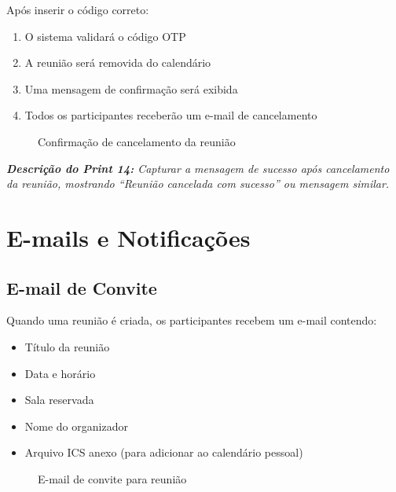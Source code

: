 \documentclass[12pt,a4paper]{article}
\begin{document}
Após inserir o código correto:

\begin{enumerate}[leftmargin=*]
    \item O sistema validará o código OTP
    \item A reunião será removida do calendário
    \item Uma mensagem de confirmação será exibida
    \item Todos os participantes receberão um e-mail de cancelamento
\end{enumerate}

\begin{figure}[H]
    \centering
    \caption{Confirmação de cancelamento da reunião}
    \label{fig:confirmacao_cancelamento}
\end{figure}

\textit{\textbf{Descrição do Print 14:} Capturar a mensagem de sucesso após cancelamento da reunião, mostrando ``Reunião cancelada com sucesso'' ou mensagem similar.}

\newpage

\section{E-mails e Notificações}

\subsection{E-mail de Convite}

Quando uma reunião é criada, os participantes recebem um e-mail contendo:

\begin{itemize}[leftmargin=*]
    \item Título da reunião
    \item Data e horário
    \item Sala reservada
    \item Nome do organizador
    \item Arquivo ICS anexo (para adicionar ao calendário pessoal)
\end{itemize}

\begin{figure}[H]
    \centering
    \caption{E-mail de convite para reunião}
    \label{fig:email_convite}
\end{figure}
\end{document}

